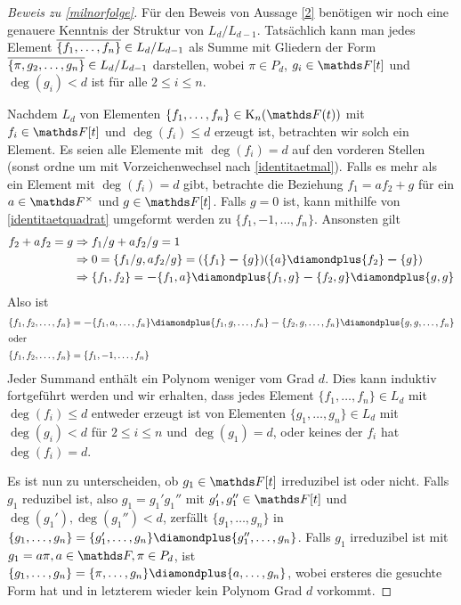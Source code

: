 \documentclass[ngerman,fontsize=11pt, paper=a4, parskip=half, titlepage=true, toc=bib]{scrartcl}
\begin{document}
\begin{proof}[Beweis zu \ref{milnorfolge}]
  Für den Beweis von Aussage \ref{2} benötigen wir noch eine genauere
  Kenntnis der Struktur von $L_d/L_{d-1}$.
  Tatsächlich kann man jedes Element 
  $\overline{\{f_1,\dotsc,f_n\}}\in L_d/L_{d-1}$ als Summe
  mit Gliedern der Form  $\overline{\{\pi,g_2,\dotsc,g_n\}}\in L_d/L_{d-1}$
  darstellen, wobei $\pi\in P_d$, $g_i\in\F[t]$ 
  und $\deg(g_i)<d$ ist für alle $2\leq i\leq n$.
  
  Nachdem $L_d$ von Elementen $\{f_1,\dotsc,f_n\}\in\KnFt$ mit
  $f_i\in\F[t]$ und $\deg(f_i)\leq d$ erzeugt ist, 
  betrachten wir solch ein Element.
  Es seien alle Elemente mit $\deg(f_i)=d$ auf den vorderen Stellen 
  (sonst ordne um mit Vorzeichenwechsel nach \ref{identitaetmal}).
  Falls es mehr als ein Element mit $\deg(f_i)=d$ gibt, betrachte
  die Beziehung $f_1=a f_2 + g$ für ein $a\in\Fx$ und $g\in\F[t]$.
  Falls $g=0$ ist, kann mithilfe von \ref{identitaetquadrat}
  umgeformt werden zu $\{f_1,-1,\dotsc,f_n\}$.
  Ansonsten gilt
  \begin{align*}
    f_2+af_2=g 
    &\Rightarrow f_1/g+af_2/g=1\\
    &\Rightarrow 0=\{f_1/g,af_2/g\}=(\{f_1\}\m\{g\})(\{a\}\p\{f_2\}\m\{g\})\\
    &\Rightarrow \{f_1,f_2\}=\m\{f_1,a\}\p\{f_1,g\}\m\{f_2,g\}\p\{g,g\}
  \end{align*}
  Also ist 
  \begin{align*}
    \{f_1,f_2,\dotsc,f_n\} 
    &=\m \{f_1,a,\dotsc,f_n\}
      \p \{f_1,g,\dotsc,f_n\}
      \m \{f_2,g,\dotsc,f_n\}
      \p \{g,g,\dotsc,f_n\}\\
    \intertext{oder}
    \{f_1,f_2,\dotsc,f_n\} 
    &=\{f_1,-1,\dotsc,f_n\}
  \end{align*}
  Jeder Summand enthält ein Polynom weniger vom Grad $d$.
  Dies kann induktiv fortgeführt werden und wir erhalten,
  dass jedes Element $\{f_1,\dotsc,f_n\}\in L_d$ mit $\deg(f_i)\leq d$
  entweder erzeugt ist von Elementen $\{g_1,\dotsc, g_n\}\in L_d$ mit
  $\deg(g_i)<d$ für $2\leq i\leq n$ und $\deg(g_1)=d$,
  oder keines der $f_i$ hat $\deg(f_i)=d$.
  
  Es ist nun zu unterscheiden, ob $g_1\in\F[t]$ irreduzibel ist oder
  nicht. Falls $g_1$ reduzibel ist, also $g_1=g_1'g_1''$ mit
  $g_1',g_1''\in\F[t]$ und $\deg(g_1'),\deg(g_1'')<d$,
  zerfällt $\{g_1,\dotsc,g_n\}$ in 
  $\{g_1,\dotsc,g_n\}=\{g_1',\dotsc,g_n\}\p\{g_1'',\dotsc,g_n\}$.
  Falls $g_1$ irreduzibel ist mit $g_1=a\pi, a\in\F, \pi\in P_d$, 
  ist $\{g_1,\dotsc,g_n\}=\{\pi,\dotsc,g_n\}\p\{a,\dotsc,g_n\}$,
  wobei ersteres die gesuchte Form hat und in letzterem wieder kein
  Polynom Grad $d$ vorkommt.


\end{proof}
\end{document}
